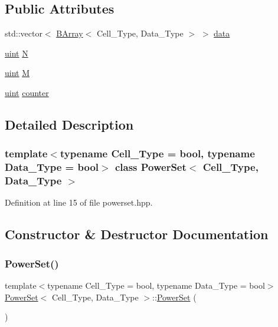 \subsection*{Public Attributes}
\begin{DoxyCompactItemize}
\item 
std\+::vector$<$ \hyperlink{class_b_array}{B\+Array}$<$ Cell\+\_\+\+Type, Data\+\_\+\+Type $>$ $>$ \hyperlink{class_power_set_abd362b10cfda594de272cfa5dd5db0ee}{data}
\item 
\hyperlink{typedefs_8hpp_a91ad9478d81a7aaf2593e8d9c3d06a14}{uint} \hyperlink{class_power_set_a47a7918d73f8f9709751aae3b1344889}{N}
\item 
\hyperlink{typedefs_8hpp_a91ad9478d81a7aaf2593e8d9c3d06a14}{uint} \hyperlink{class_power_set_a03cb2e123a85cc761375835fc59cab3a}{M}
\item 
\hyperlink{typedefs_8hpp_a91ad9478d81a7aaf2593e8d9c3d06a14}{uint} \hyperlink{class_power_set_a4c6f00df0ab8cfce977635958c6e1b46}{counter}
\end{DoxyCompactItemize}


\subsection{Detailed Description}
\subsubsection*{template$<$typename Cell\+\_\+\+Type = bool, typename Data\+\_\+\+Type = bool$>$\newline
class Power\+Set$<$ Cell\+\_\+\+Type, Data\+\_\+\+Type $>$}



Definition at line 15 of file powerset.\+hpp.



\subsection{Constructor \& Destructor Documentation}
\mbox{\label{class_power_set_a3eacd45a7ed035773020df7d1db154c0}} 
\subsubsection{\texorpdfstring{Power\+Set()}{PowerSet()}\hspace{0.1cm}{\footnotesize\ttfamily [1/2]}}
{\footnotesize\ttfamily template$<$typename Cell\+\_\+\+Type  = bool, typename Data\+\_\+\+Type  = bool$>$ \\
\hyperlink{class_power_set}{Power\+Set}$<$ Cell\+\_\+\+Type, Data\+\_\+\+Type $>$\+::\hyperlink{class_power_set}{Power\+Set} (\begin{DoxyParamCaption}{ }\end{DoxyParamCaption})\hspace{0.3cm}{\ttfamily [inline]}}



